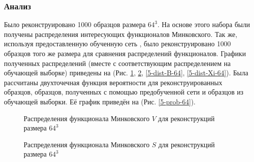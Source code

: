 		\subsubsection{Анализ}
			Было реконструировано 1000 образцов размера $64^3$. На основе этого набора были получены распределения интересующих функционалов Минковского. Так же, используя предоставленную обученную сеть \cite{Mosser}, было реконструировано 1000 образцов того же размера для сравнения распределений функционалов. Графики полученных распределений (вместе с соответствующим распределением на обучающей выборке) приведены на (Рис. \ref{5-dist-V-64}, \ref{5-dist-S-64}, \ref{5-dist-B-64}, \ref{5-dist-Xi-64}). Была рассчитаны двухточечная функция вероятности для реконструированных образцов, образцов, полученных с помощью предобученной сети \cite{Mosser} и образцов из обучающей выборки. Её график приведён на (Рис. \ref{5-prob-64}).
			
			\begin{figure}[h]
				\begin{minipage}[h]{0.49\linewidth}
				\end{minipage}
				\hfill
				\begin{minipage}[h]{0.49\linewidth}
				\end{minipage}
				\caption{Распределения функционала Минковского $V$ для реконструкций размера $64^3$}
				\label{5-dist-V-64}
			\end{figure}
		
			\begin{figure}[h]
				\begin{minipage}[h]{0.49\linewidth}
				\end{minipage}
				\hfill
				\begin{minipage}[h]{0.49\linewidth}
				\end{minipage}
				\caption{Распределения функционала Минковского $S$ для реконструкций размера $64^3$}
				\label{5-dist-S-64}
			\end{figure}
		
